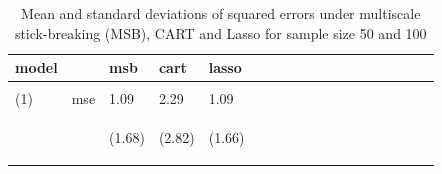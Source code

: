 \documentclass{article}
\begin{document}
\begin{table}[t]
\caption{Mean and standard deviations of squared errors under multiscale stick-breaking (MSB), CART and Lasso for sample size 50 and 100}
\label{table1} \vskip 0.15in \begin{center} \begin{small} \begin{sc}
\begin{tabular}{llllllllllllllllll}
\hline
\abovespace\belowspace
 model&& msb&cart&lasso\\
\hline
\\
(1)&mse&     1.09 & 2.29 & 1.09\\
& & \begin{scriptsize} (1.68)\end{scriptsize} & \begin{scriptsize} (2.82)\end{scriptsize}& \begin{scriptsize} (1.66)\end{scriptsize}\\


\end{tabular}
\end{sc}
\end{small}
\end{center}
\end{table}
\end{document}
